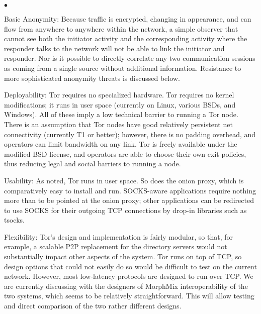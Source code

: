 \documentclass[times,10pt,twocolumn]{article}
\newenvironment{tightlist}{\begin{list}{$\bullet$}{
  \setlength{\itemsep}{0mm}
    \setlength{\parsep}{0mm}
    }}{\end{list}}
\begin{document}
\begin{tightlist}
\item [Basic Anonymity:] Because traffic is encrypted, changing in
  appearance, and can flow from anywhere to anywhere within the
  network, a simple observer that cannot see both the initiator
  activity and the corresponding activity where the responder talks to
  the network will not be able to link the initiator and responder.
  Nor is it possible to directly correlate any two communication
  sessions as coming from a single source without additional
  information. Resistance to more sophisticated anonymity threats is
  discussed below.
\item[Deployability:] Tor requires no specialized hardware. Tor
  requires no kernel modifications; it runs in user space (currently
  on Linux, various BSDs, and Windows). All of these imply a low
  technical barrier to running a Tor node. There is an assumption that
  Tor nodes have good relatively persistent net connectivity
  (currently T1 or better);
  however, there is no padding overhead, and operators can limit
  bandwidth on any link.  Tor is freely available under the modified
  BSD license, and operators are able to choose their own exit
  policies, thus reducing legal and social barriers to
  running a node.
  
\item[Usability:] As noted, Tor runs in user space. So does the onion
  proxy, which is comparatively easy to install and run. SOCKS-aware
  applications require nothing more than to be pointed at the onion
  proxy; other applications can be redirected to use SOCKS for their
  outgoing TCP connections by drop-in libraries such as tsocks.
  
\item[Flexibility:] Tor's design and implementation is fairly modular,
  so that,
  for example, a scalable P2P replacement for the directory servers
  would not substantially impact other aspects of the system.  Tor
  runs on top of TCP, so design options that could not easily do so
  would be difficult to test on the current network. However, most
  low-latency protocols are designed to run over TCP. We are currently
  discussing with the designers of MorphMix interoperability of the
  two systems, which seems to be relatively straightforward. This will
  allow testing and direct comparison of the two rather different
  designs.
  

\end{tightlist}
\end{document}
